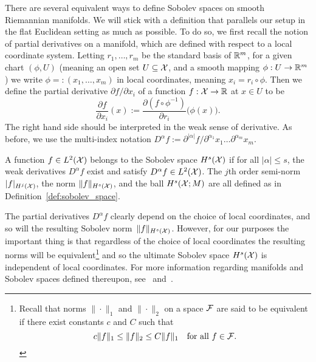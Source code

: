 There are several equivalent ways to define Sobolev spaces on smooth Riemannian manifolds. We will stick with a definition that parallels our setup in the flat Euclidean setting as much as possible. To do so, we first recall the notion of partial derivatives on a manifold, which are defined with respect to a local coordinate system. Letting $r_1,\ldots,r_m$ be the standard basis of $\mathbb{R}^m$, for a given chart $(\phi,U)$ (meaning an open set $U \subseteq \mathcal{X}$, and a smooth mapping $\phi: U \to \mathbb{R}^m$) we write $\phi =: (x_1,\ldots,x_m)$ in local coordinates, meaning $x_i = r_i \circ \phi$. Then we define the partial derivative $\partial f/\partial x_i$ of a function $f: \mathcal{X} \to \mathbb{R}$ at $x \in U$ to be
\begin{equation*}
\frac{\partial f}{\partial x_i}(x) := \frac{\partial(f \circ \phi^{-1})}{\partial r_i}\bigl(\phi(x)\bigr).
\end{equation*}
The right hand side should be interpreted in the weak sense of derivative. As before, we use the multi-index notation $D^{\alpha}f := \partial^{|\alpha|}f/\partial^{\alpha_1}x_1\ldots\partial^{\alpha_m}x_m$. 

\begin{definition}
	\label{def:sobolev_space_manifold}
	A function $f \in L^2(\mathcal{X})$ belongs to the Sobolev space $H^{s}(\mathcal{X})$ if for all $|\alpha| \leq s$, the weak derivatives $D^{\alpha}f$ exist and satisfy  $D^{\alpha}f \in L^2(\mathcal{X})$. The $j$th order semi-norm $|f|_{H^j(\mathcal{X})}$, the norm $\|f\|_{H^s(\mathcal{X})}$, and the ball $H^s(\mathcal{X};M)$ are all defined as in Definition~\ref{def:sobolev_space}.
\end{definition}
The partial derivatives $D^{\alpha}f$ clearly depend on the choice of local coordinates, and so will the resulting Sobolev norm~$\|f\|_{H^s(\mathcal{X})}$. However, for our purposes the important thing is that regardless of the choice of local coordinates the resulting norms will be equivalent\footnote{Recall that norms $\|\cdot\|_1$ and $\|\cdot\|_2$ on a space $\mathcal{F}$ are said to be equivalent if there exist constants $c$ and $C$ such that
	\begin{equation*}
	c \|f\|_1 \leq \|f\|_2 \leq C \|f\|_1 \quad \textrm{for all $f \in \mathcal{F}$.}
	\end{equation*}} 
and so the ultimate Sobolev space $H^s(\mathcal{X})$ is independent of local coordinates. For more information regarding manifolds and Sobolev spaces defined thereupon, see~\cite{lee2013} and~\cite{hebey1996}.

